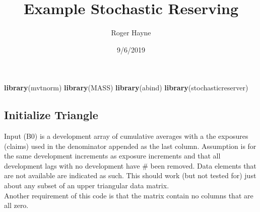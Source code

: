 \documentclass[]{article}
\title{Example Stochastic Reserving}
\author{Roger Hayne}
\date{9/6/2019}
\newenvironment{Shaded}{\begin{snugshade}}{\end{snugshade}}
\newcommand{\KeywordTok}[1]{\textcolor[rgb]{0.13,0.29,0.53}{\textbf{#1}}}
\newcommand{\NormalTok}[1]{#1}
\begin{document}
\maketitle

\begin{Shaded}
\begin{Highlighting}[]
\KeywordTok{library}\NormalTok{(mvtnorm)}
\KeywordTok{library}\NormalTok{(MASS)}
\KeywordTok{library}\NormalTok{(abind)}
\KeywordTok{library}\NormalTok{(stochasticreserver)}
\end{Highlighting}
\end{Shaded}

\hypertarget{initialize-triangle}{%
\subsection{Initialize Triangle}\label{initialize-triangle}}

Input (B0) is a development array of cumulative averages with a the
exposures (claims) used in the denominator appended as the last column.
Assumption is for the same development increments as exposure increments
and that all development lags with no development have \# been removed.
Data elements that are not available are indicated as such. This should
work (but not tested for) just about any subset of an upper triangular
data matrix.\\
Another requirement of this code is that the matrix contain no columns
that are all zero.
\end{document}
